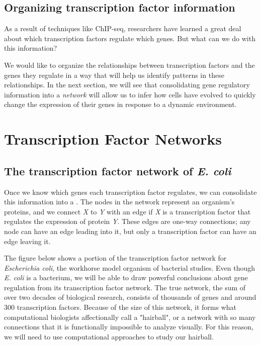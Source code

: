 \begin{qbox}\end{qbox} 


\FloatBarrier
{}
\subsection{Organizing transcription factor information}

As a result of techniques like ChIP-seq, researchers have learned a great deal about which transcription factors regulate which genes. But what can we do with this information?

We would like to organize the relationships between transcription factors and the genes they regulate in a way that will help us identify patterns in these relationships. In the next section, we will see that consolidating gene regulatory information into a \textit{network} will allow us to infer how cells have evolved to quickly change the expression of their genes in response to a dynamic environment.


\FloatBarrier
{}

\section{Transcription Factor Networks}
\label{sec:transcription_factor_networks}

\subsection{The transcription factor network of \textit{E. coli}}

Once we know which genes each transcription factor regulates, we can consolidate this information into a . The nodes in the network represent an organism's proteins, and we connect \textit{X} to \textit{Y} with an edge if \textit{X} is a transcription factor that regulates the expression of protein \textit{Y}. These edges are one-way connections; any node can have an edge leading into it, but only a transcription factor can have an edge leaving it.

The figure below shows a portion of the transcription factor network for \textit{Escherichia coli}, the workhorse model organism of bacterial studies. Even though \textit{E. coli} is a bacterium, we will be able to draw powerful conclusions about gene regulation from its transcription factor network. The true network, the sum of over two decades of biological research, consists of thousands of genes and around 300 transcription factors. Because of the size of this network, it forms what computational biologists affectionally call a "hairball", or a network with so many connections that it is functionally impossible to analyze visually. For this reason, we will need to use computational approaches to study our hairball.

